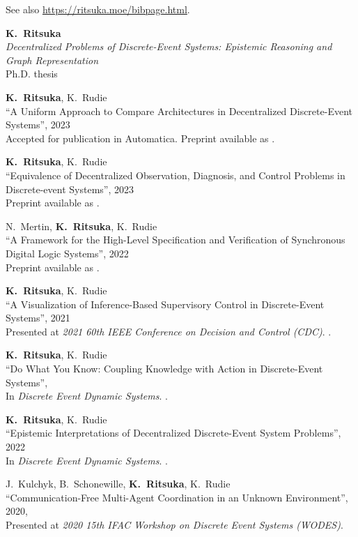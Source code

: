 \documentclass[margin]{res}
\begin{document}
\begin{resume}
See also \url{https://ritsuka.moe/bibpage.html}.

{\bf K.~Ritsuka}\\
\textit{Decentralized Problems of Discrete-Event Systems:
Epistemic Reasoning and Graph Representation}\\
Ph.D. thesis

{\bf K.~Ritsuka}, K.~Rudie\\
``A Uniform Approach to Compare Architectures in Decentralized Discrete-Event Systems'',
2023\\
Accepted for publication in Automatica. Preprint available as .

{\bf K.~Ritsuka}, K.~Rudie\\
``Equivalence of Decentralized Observation, Diagnosis, and Control Problems in Discrete-event Systems'',
2023\\
Preprint available as .

N.~Mertin, {\bf K.~Ritsuka}, K.~Rudie\\
``A Framework for the High-Level Specification and Verification of Synchronous Digital Logic Systems'',
2022\\
Preprint available as .

{\bf K.~Ritsuka}, K.~Rudie\\
``A Visualization of Inference-Based Supervisory Control in Discrete-Event Systems'',
2021\\
Presented at \emph{2021 60th IEEE Conference on Decision and Control (CDC)}.
.

{\bf K.~Ritsuka}, K.~Rudie\\
``Do What You Know: Coupling Knowledge with Action in Discrete-Event Systems'',\\
In \emph{Discrete Event Dynamic Systems}.
.

{\bf K.~Ritsuka}, K.~Rudie\\
``Epistemic Interpretations of Decentralized Discrete-Event System Problems'',
2022\\
In \emph{Discrete Event Dynamic Systems}.
.

J.~Kulchyk, B.~Schonewille, {\bf K.~Ritsuka}, K.~Rudie\\
``Communication-Free Multi-Agent Coordination in an Unknown Environment'',
2020,\\
Presented at \emph{2020 15th IFAC Workshop on Discrete Event Systems (WODES)}.


\end{resume}
\end{document}

